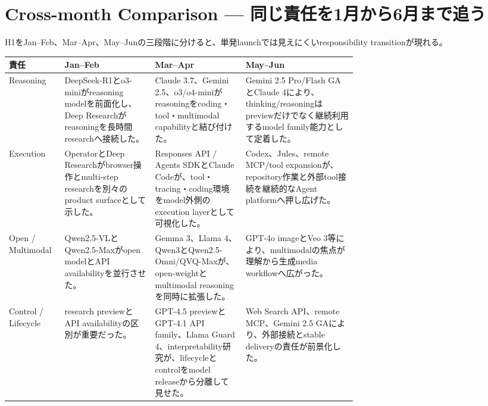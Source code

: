 \Needspace{0.38\textheight}
\section{Cross-month Comparison — 同じ責任を1月から6月まで追う}
\label{analysis:h1-cross-month}

H1をJan--Feb、Mar--Apr、May--Junの三段階に分けると、単発launchでは見えにくいresponsibility transitionが現れる。

\begin{center}
\footnotesize
\renewcommand{\arraystretch}{1.18}
\begin{tabularx}{\linewidth}{@{}p{0.16\linewidth}p{0.26\linewidth}p{0.26\linewidth}X@{}}
\toprule
責任 & Jan--Feb & Mar--Apr & May--Jun \\
\midrule
Reasoning &
DeepSeek-R1とo3-miniがreasoning modelを前面化し、Deep Researchがreasoningを長時間researchへ接続した。
\cite{src-8f8555b73e1b,src-650b567698aa,src-8fec3ef3a97d} &
Claude 3.7、Gemini 2.5、o3/o4-miniがreasoningをcoding・tool・multimodal capabilityと結び付けた。
\cite{src-a6c92f94a0af,src-421ee9af3f80,src-bf92f3d905c3} &
Gemini 2.5 Pro/Flash GAとClaude 4により、thinking/reasoningはpreviewだけでなく継続利用するmodel family能力として定着した。
\cite{src-53f15d483a2d,src-4ec03078d316} \\
Execution &
OperatorとDeep Researchがbrowser操作とmulti-step researchを別々のproduct surfaceとして示した。
\cite{src-95b210494c88,src-8fec3ef3a97d} &
Responses API / Agents SDKとClaude Codeが、tool・tracing・coding環境をmodel外側のexecution layerとして可視化した。
\cite{src-78593f4b387f,src-a6c92f94a0af} &
Codex、Jules、remote MCP/tool expansionが、repository作業と外部tool接続を継続的なAgent platformへ押し広げた。
\cite{src-e7aef8f1b13b,src-8b595b787bad,src-9257c39d4172} \\
Open / Multimodal &
Qwen2.5-VLとQwen2.5-Maxがopen modelとAPI availabilityを並行させた。
\cite{src-dc21f366b638,src-8c485019ad8d} &
Gemma 3、Llama 4、Qwen3とQwen2.5-Omni/QVQ-Maxが、open-weightとmultimodal reasoningを同時に拡張した。
\cite{src-1bb16d7254b1,src-05f285e9757b,src-3e4a3f3b3d83,src-de4ffd746276,src-8cb736b33646} &
GPT-4o imageとVeo 3等により、multimodalの焦点が理解から生成media workflowへ広がった。
\cite{src-877e7da88408,src-e68f8ce96685} \\
Control / Lifecycle &
research previewとAPI availabilityの区別が重要だった。 &
GPT-4.5 previewとGPT-4.1 API family、Llama Guard 4、interpretability研究が、lifecycleとcontrolをmodel releaseから分離して見せた。
\cite{src-3fa7f4cd510b,src-31799a46d8d0,src-383476bdf62e,src-fdc10e3226e6} &
Web Search API、remote MCP、Gemini 2.5 GAにより、外部接続とstable deliveryの責任が前景化した。
\cite{src-e31c642d34b6,src-9257c39d4172,src-53f15d483a2d} \\
\bottomrule
\end{tabularx}
\renewcommand{\arraystretch}{1.0}
\end{center}
\normalsize

